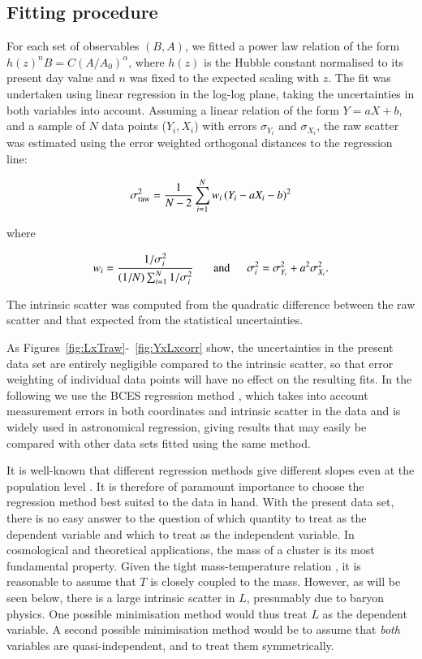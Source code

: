 \documentclass[oldversion]{aa}
\begin{document}
{%

\subsection{Fitting procedure}
\label{sec:fitting}

For each set of observables $(B,A)$, we fitted a power law relation of
the form $h(z)^n B = C (A/A_0)^\alpha$, where $h(z)$ is the Hubble
constant normalised to its present day value and $n$ was fixed to the
expected scaling with $z$. The fit was undertaken using linear
regression in the log-log plane, taking the uncertainties in both
variables into account. Assuming a linear relation of the form $Y= aX + b$, and a sample of $N$ data points ($Y_i,X_i$) with errors $\sigma_{Y_i}$ and $\sigma_{X_i}$, the raw scatter was estimated using the
error weighted orthogonal distances to the regression line:

\begin{equation}
\sigma^2_{\rm raw} = \frac{1}{N-2} \sum_{i=1}^{N} w_i\, (Y_i -aX_i -b)^2
\end{equation}

\noindent where

\begin{equation}
w_i = \frac{1/\sigma_i^2}{(1/N) \sum_{i=1}^N 1/\sigma_i^2}\ \ \ \ \ \ \ {\rm and}\ \ \ \ \ \ \sigma_i^2 = \sigma^2_{Y_i} + a^2 \sigma^2_{X_i}.
\end{equation}

\noindent  The intrinsic scatter was computed from the quadratic difference between the raw scatter and that expected from the statistical uncertainties. 

As Figures~\ref{fig:LxTraw}-~\ref{fig:YxLxcorr} show, the uncertainties in the present data set are entirely negligible compared to the intrinsic scatter, so that error weighting of individual data points will have no effect on the resulting fits. In the following we use the BCES regression method \citep{bces}, which takes into account measurement errors in both coordinates and intrinsic scatter in the data and is  widely used in astronomical regression, giving results that may easily be compared with other data sets fitted using the same method.

It is well-known that different regression methods give different slopes even at the population level \citep[e.g.,][]{isobe,bces}.  It is therefore of paramount importance to choose the regression method best suited to the data in hand. With the present data set, there is no easy answer to the question of which quantity to treat as the dependent variable and which to treat as the independent variable. In cosmological and theoretical applications, the mass of a cluster is its most fundamental property. Given the tight mass-temperature relation \citep[e.g.,][]{app05}, it is reasonable to assume that $T$ is closely coupled to the mass. However, as will be seen below, there is a large intrinsic scatter in $L$, presumably due to baryon physics. One possible minimisation method would thus treat $L$ as the dependent variable. A second possible minimisation method would be to assume that {\it both} variables are quasi-independent, and to treat them symmetrically. 

}
\end{document}
